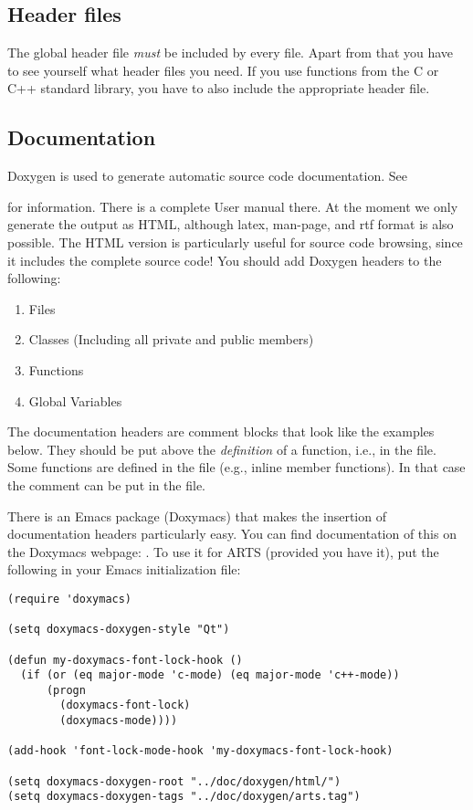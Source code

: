 \subsection{Header files} 
The global header file  \emph{must} be included by every
file. Apart from that you have to see yourself what header files you
need. If you use functions from the C or C++ standard library, you
have to also include the appropriate header file.

\subsection{Documentation}
Doxygen is used to generate automatic source code documentation. See
\begin{quote}
\end{quote}
for information. There is a complete User manual there. At the moment
we only generate the output as HTML, although latex, man-page, and rtf
format is also possible. The HTML version is particularly useful for
source code browsing, since it includes the complete source code! You
should add Doxygen headers to the following:

\begin{enumerate}
\item Files
\item Classes (Including all private and public members)
\item Functions
\item Global Variables
\end{enumerate}

The documentation headers are comment blocks that look like the
examples below. They should be put above the \emph{definition} of a
function, i.e., in the  file.  Some functions are defined in
the  file (e.g., inline member functions). In that case the
comment can be put in the  file.

There is an Emacs package (Doxymacs) that makes the insertion of
documentation headers particularly easy. You can find documentation of
this on the Doxymacs webpage: .
To use it for ARTS (provided you have it), put the following in your
Emacs initialization file:

\begin{verbatim}
(require 'doxymacs)

(setq doxymacs-doxygen-style "Qt")

(defun my-doxymacs-font-lock-hook ()
  (if (or (eq major-mode 'c-mode) (eq major-mode 'c++-mode))
      (progn
        (doxymacs-font-lock)
        (doxymacs-mode))))

(add-hook 'font-lock-mode-hook 'my-doxymacs-font-lock-hook)

(setq doxymacs-doxygen-root "../doc/doxygen/html/")
(setq doxymacs-doxygen-tags "../doc/doxygen/arts.tag")
\end{verbatim}

